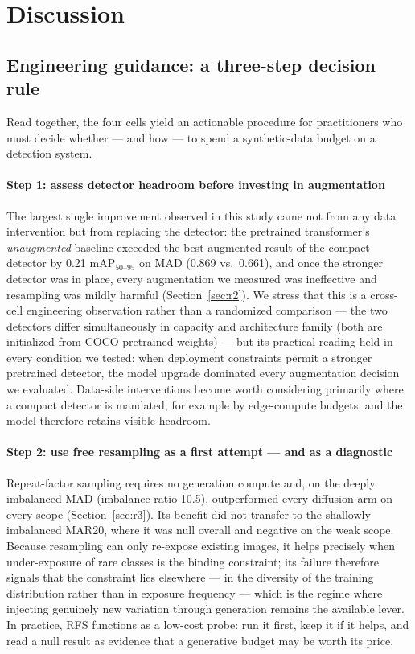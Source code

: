 \documentclass[preprint,12pt,authoryear]{elsarticle}
\newcommand{\mapm}{mAP\(_{50\text{--}95}\)}
\begin{document}
\section{Discussion}\label{sec:discussion}

\subsection{Engineering guidance: a three-step decision rule}\label{sec:rules}

Read together, the four cells yield an actionable procedure for
practitioners who must decide whether --- and how --- to spend a
synthetic-data budget on a detection system.

\paragraph{Step 1: assess detector headroom before investing in
augmentation}
The largest single improvement observed in this study came not from any
data intervention but from replacing the detector: the pretrained
transformer's \emph{unaugmented} baseline exceeded the best augmented
result of the compact detector by 0.21 \mapm{} on MAD (0.869 vs.\
0.661), and once the stronger detector was in place, every augmentation
we measured was ineffective and resampling was mildly harmful
(Section~\ref{sec:r2}). We stress that this is a cross-cell engineering
observation rather than a randomized comparison --- the two detectors
differ simultaneously in capacity and architecture family (both are
initialized from COCO-pretrained weights) --- but its practical reading
held in every condition we tested: when deployment constraints permit a
stronger pretrained detector, the model upgrade dominated every
augmentation decision we evaluated. Data-side interventions become
worth considering primarily where a compact detector is mandated, for
example by edge-compute budgets, and the model therefore retains
visible headroom.

\paragraph{Step 2: use free resampling as a first attempt --- and as a
diagnostic}
Repeat-factor sampling requires no generation compute and, on the deeply
imbalanced MAD (imbalance ratio 10.5), outperformed every diffusion arm
on every scope (Section~\ref{sec:r3}). Its benefit did not transfer to
the shallowly imbalanced MAR20, where it was null overall and negative
on the weak scope. Because resampling can only re-expose existing
images, it helps precisely when under-exposure of rare classes is the
binding constraint; its failure therefore signals that the constraint
lies elsewhere --- in the diversity of the training distribution rather
than in exposure frequency --- which is the regime where injecting
genuinely new variation through generation remains the available lever.
In practice, RFS functions as a low-cost probe: run it first, keep it if
it helps, and read a null result as evidence that a generative budget
may be worth its price.
\end{document}
